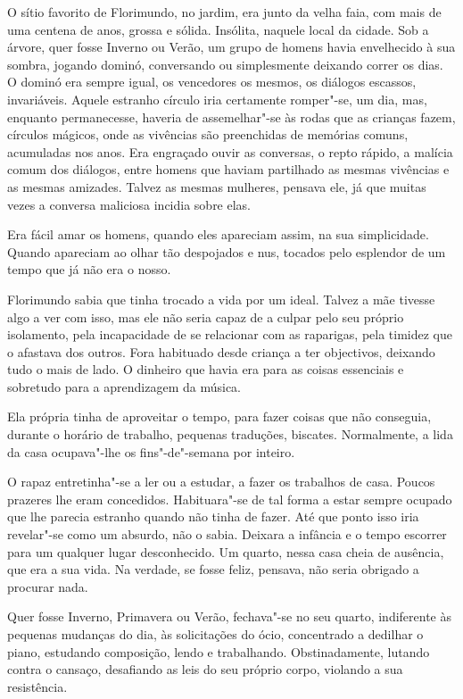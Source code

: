 O sítio favorito de Florimundo, no jardim, era junto da velha faia, com
mais de uma centena de anos, grossa e sólida. Insólita, naquele local da
cidade. Sob a árvore, quer fosse Inverno ou Verão, um grupo de homens
havia envelhecido à sua sombra, jogando dominó, conversando ou
simplesmente deixando correr os dias. O dominó era sempre igual, os
vencedores os mesmos, os diálogos escassos, invariáveis. Aquele estranho
círculo iria certamente romper"-se, um dia, mas, enquanto permanecesse,
haveria de assemelhar"-se às rodas que as crianças fazem, círculos
mágicos, onde as vivências são preenchidas de memórias comuns,
acumuladas nos anos. Era engraçado ouvir as conversas, o repto rápido, a
malícia comum dos diálogos, entre homens que haviam partilhado as mesmas
vivências e as mesmas amizades. Talvez as mesmas mulheres, pensava ele,
já que muitas vezes a conversa maliciosa incidia sobre elas.

Era fácil amar os homens, quando eles apareciam assim, na sua
simplicidade. Quando apareciam ao olhar tão despojados e nus, tocados
pelo esplendor de um tempo que já não era o nosso.

Florimundo sabia que tinha trocado a vida por um ideal. Talvez a mãe
tivesse algo a ver com isso, mas ele não seria capaz de a culpar pelo
seu próprio isolamento, pela incapacidade de se relacionar com as
raparigas, pela timidez que o afastava dos outros. Fora habituado desde
criança a ter objectivos, deixando tudo o mais de lado. O dinheiro que
havia era para as coisas essenciais e sobretudo para a aprendizagem da
música.

Ela própria tinha de aproveitar o tempo, para fazer coisas que não
conseguia, durante o horário de trabalho, pequenas traduções, biscates.
Normalmente, a lida da casa ocupava"-lhe os fins"-de"-semana por inteiro.

O rapaz entretinha"-se a ler ou a estudar, a fazer os trabalhos de casa.
Poucos prazeres lhe eram concedidos. Habituara"-se de tal forma a estar
sempre ocupado que lhe parecia estranho quando não tinha de fazer. Até
que ponto isso iria revelar"-se como um absurdo, não o sabia. Deixara a
infância e o tempo escorrer para um qualquer lugar desconhecido. Um
quarto, nessa casa cheia de ausência, que era a sua vida. Na verdade, se
fosse feliz, pensava, não seria obrigado a procurar nada.

Quer fosse Inverno, Primavera ou Verão, fechava"-se no seu quarto,
indiferente às pequenas mudanças do dia, às solicitações do ócio,
concentrado a dedilhar o piano, estudando composição, lendo e
trabalhando. Obstinadamente, lutando contra o cansaço, desafiando as
leis do seu próprio corpo, violando a sua resistência.

